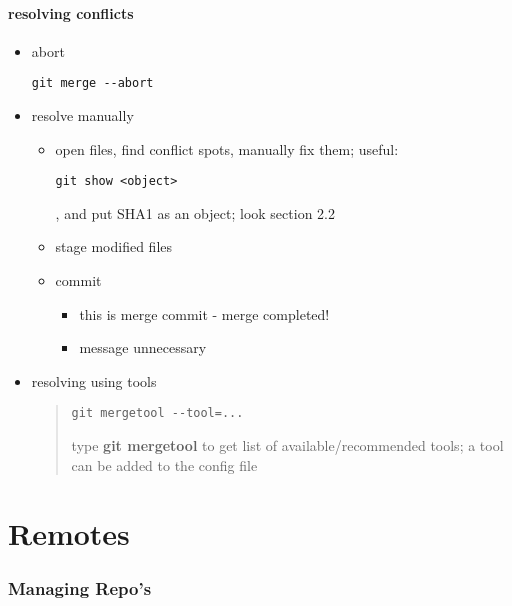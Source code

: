 \documentclass{report}
\begin{document}
\subsection{resolving conflicts}
\begin{itemize}
\item abort
\begin{verbatim}
git merge --abort
\end{verbatim}

\item resolve manually
\begin{itemize}
\item open files, find conflict spots, manually fix them; useful:
\begin{verbatim}
git show <object>
\end{verbatim}
, and put SHA1 as an object; look section 2.2
\item stage modified files
\item commit
\begin{itemize}
\item this is merge commit - merge completed!
\item message unnecessary
\end{itemize}
\end{itemize}

\item resolving using tools
\begin{quote}
\begin{verbatim}
git mergetool --tool=...
\end{verbatim}
type \textbf{git mergetool} to get list of available/recommended tools; a tool can be added to the config file
\end{quote}

\end{itemize}



\part{Remotes}


\section{Managing Repo's}
\end{document}
